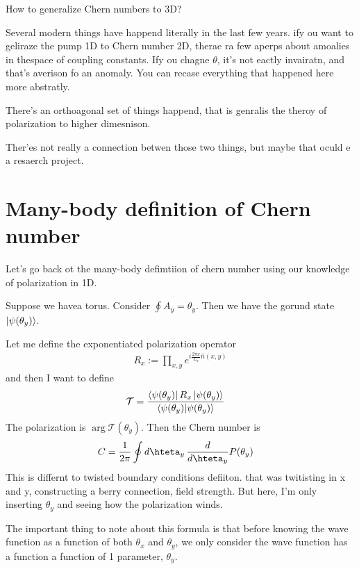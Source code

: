 \begin{question}
    How to generalize Chern numbers to 3D?
\end{question}
Several modern things have happend literally in the last few years.
ify ou want to geliraze the pump 1D to Chern number 2D,
therae ra few aperps about amoalies in thespace of coupling constants.
Ify ou chagne $\theta$,
it's not eactly invairatn,
and that's averison fo an anomaly.
You can recase everything that happened here more abstratly.

There's an orthoagonal set of things happend,
that is genralis the theroy of polarization to higher dimesnison.

Ther'es not really a connection betwen those two things,
but maybe that oculd e a resaerch project.

\section{Many-body definition of Chern number}
Let's go back ot the many-body defimtiion of chern number
using our knowledge of polarization in 1D.

Suppose we havea torus.
Consider $\oint A_y = \theta_y$.
Then we have the gorund state $\ket{\psi(\theta_y)}$.

Let me define the exponentiated polarization operator
\begin{align}
    R_x :=
    \prod_{x, y}
    e^{i \frac{2\pi x}{L_x} \hat{n}(x, y)}
\end{align}
and then I want to define
\begin{align}
    \mathcal{T} &=
    \frac{\bra{\psi(\theta_y)} R_x \ket{\psi(\theta_y)}}{%
    \braket{\psi(\theta_y)}{\psi(\theta_y)}
    }
\end{align}
The polarization is $\arg \mathcal{T}(\theta_y)$.
Then the Chern number is
\begin{align}
    C &= \frac{1}{2\pi} \oint d\hteta_y\,
    \frac{d}{d\hteta_y} P(\theta_y)
\end{align}
This is differnt to twisted boundary conditions defiiton.
that was twitisting in x and y,
constructing a berry connection, field strength.
But here,
I'm only inserting $\theta_y$
and seeing how the polarization winds.

The important thing to note about this formula is that before knowing the wave
function as a function of both $\theta_x$ and $\theta_y$,
we only consider the wave function has a function a function of 1 parameter,
$\theta_y$.

